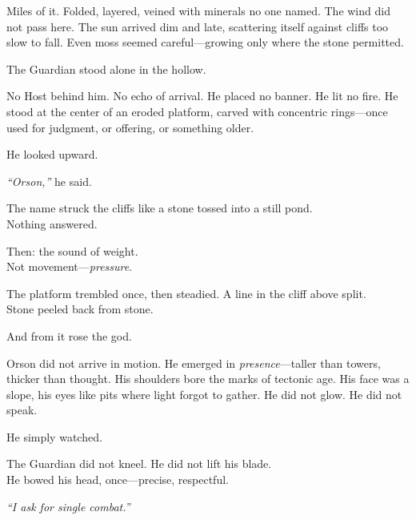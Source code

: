\documentclass[12pt]{article}
\begin{document}
\vspace{0.5em}
Miles of it. Folded, layered, veined with minerals no one named. The wind did not pass here. The sun arrived dim and late, scattering itself against cliffs too slow to fall. Even moss seemed careful---growing only where the stone permitted.

\vspace{0.5em}
The Guardian stood alone in the hollow.

\vspace{0.5em}
No Host behind him. No echo of arrival. He placed no banner. He lit no fire. He stood at the center of an eroded platform, carved with concentric rings---once used for judgment, or offering, or something older.

\vspace{0.5em}
He looked upward.

\vspace{0.5em}
\textit{``Orson,''} he said.

\vspace{0.5em}
The name struck the cliffs like a stone tossed into a still pond.\\
Nothing answered.

\vspace{0.5em}
Then: the sound of weight.\\
Not movement---\textit{pressure}.

\vspace{0.5em}
The platform trembled once, then steadied. A line in the cliff above split.\\
Stone peeled back from stone.

\vspace{0.5em}
And from it rose the god.

\vspace{0.5em}
Orson did not arrive in motion. He emerged in \textit{presence}---taller than towers, thicker than thought. His shoulders bore the marks of tectonic age. His face was a slope, his eyes like pits where light forgot to gather. He did not glow. He did not speak.

\vspace{0.5em}
He simply watched.

\vspace{0.5em}
The Guardian did not kneel. He did not lift his blade.\\
He bowed his head, once---precise, respectful.

\vspace{0.5em}
\textit{``I ask for single combat.''}
\end{document}
